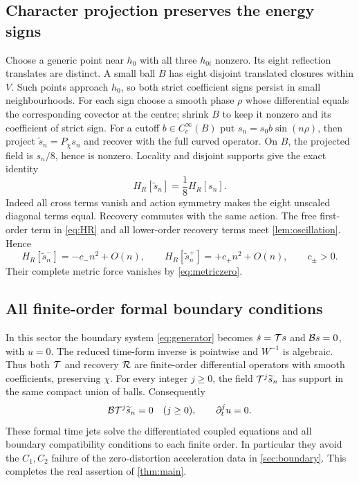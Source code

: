 \subsection{Character projection preserves the energy signs}
Choose a generic point near $h_0$ with all three $h_{0i}$ nonzero.
Its eight reflection translates are distinct. A small ball $B$ has eight
disjoint translated closures within $V$. Such points approach $h_0$,
so both strict coefficient signs persist in small neighbourhoods.
For each sign choose a smooth phase $\rho$ whose differential equals
the corresponding covector at the centre; shrink $B$ to keep it nonzero
and its coefficient of strict sign. For a cutoff $b\in C_c^\infty(B)$
put $s_n=s_0b\sin(n\rho)$, then project
$\widetilde s_n=P_\chi s_n$ and recover with the full curved operator.
On $B$, the projected field is $s_n/8$, hence is nonzero.
Locality and disjoint supports give the exact identity
\begin{equation}
 H_R[\widetilde s_n]=\frac18H_R[s_n].\label{eq:disjoint}
\end{equation}
Indeed all cross terms vanish and action symmetry makes the eight
unscaled diagonal terms equal. Recovery commutes with the same action.
The free first-order term in \eqref{eq:HR} and all lower-order recovery
terms meet \cref{lem:oscillation}. Hence
\begin{equation}
 H_R[\widetilde s_n^-]=-c_-n^2+O(n),\qquad
 H_R[\widetilde s_n^+]=+c_+n^2+O(n),\qquad c_\pm>0.
 \label{eq:real-asymptotic}
\end{equation}
Their complete metric force vanishes by \eqref{eq:metriczero}.

\subsection{All finite-order formal boundary conditions}
In this sector the boundary system \eqref{eq:generator} becomes
$\dot s=\mathcal T s$ and $\mathcal B s=0$, with $u=0$.
The reduced time-form inverse is pointwise and $W^{-1}$ is algebraic.
Thus both $\mathcal T$ and recovery $\mathcal R$ are finite-order differential
operators with smooth coefficients, preserving $\chi$.
For every integer $j\ge0$, the field $\mathcal T^j\widetilde s_n$ has support
in the same compact union of balls. Consequently
\begin{equation}
 \mathcal B\mathcal T^j\widetilde s_n=0\quad(j\ge0),\qquad
 \partial_t^j u=0.\label{eq:allorder}
\end{equation}
These formal time jets solve the differentiated coupled equations and
all boundary compatibility conditions to each finite order. In particular
they avoid the $C_1,C_2$ failure of the zero-distortion acceleration data
in \cref{sec:boundary}. This completes the real assertion of
\cref{thm:main}.

